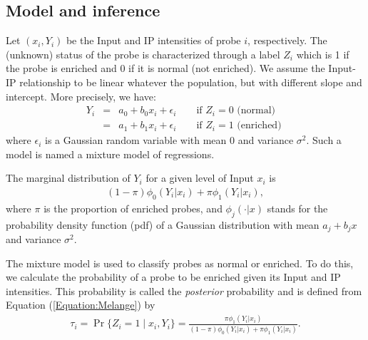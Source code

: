 \documentclass{llncs}
\begin{document}
\subsection{Model and inference}
Let $(x_i,Y_i)$ be the Input and IP intensities of probe $i$,
respectively. The  (unknown) status of the probe is characterized
through a label $Z_i$ which is 1 if the probe is enriched and 0 if
it is normal (not enriched). We assume the Input-IP relationship to
be linear whatever the population, but with different slope and
intercept. More precisely, we have:
\begin{eqnarray}
Y_i &=& a_0 + b_0 x_i + \epsilon_i  \qquad \text{if } Z_i=0 \text{ (normal) } \nonumber\\
 &=& a_1 + b_1 x_i + \epsilon_i  \qquad \text{if } Z_i=1 \text{  (enriched) } \nonumber
\end{eqnarray}
where $\epsilon_i$ is a Gaussian random variable with mean 0 and
variance $\sigma^2$. Such a model is named a mixture model of
regressions.
%
%
%
%

The marginal distribution of $Y_i$ for a given level of Input $x_i$
is
\begin{eqnarray}
(1-\pi) \phi_0(Y_i | x_i) + \pi \phi_1(Y_i | x_i),
\label{Equation:Melange} %
\end{eqnarray}
where $\pi$ is the proportion of enriched probes, and
$\phi_j(\cdot|x)$ stands for the probability density function (pdf) of
a Gaussian distribution with mean $a_j+b_j x$ and variance $\sigma^2$.


The mixture model is used to classify probes as normal or enriched. To do this, we calculate
the probability of a probe to be enriched given its Input and IP intensities. This probability
is called the \textit{posterior} probability and is defined from Equation
(\ref{Equation:Melange}) by
\begin{eqnarray}
\tau_i = \Pr\{Z_i=1 \;|\; x_i,Y_i\}=\frac{\pi
  \phi_1(Y_i |x_i)}{(1-\pi) \phi_0(Y_i|x_i) + \pi \phi_1(Y_i|x_i)}. \label{Equation:Posterior}
\end{eqnarray}
\end{document}
